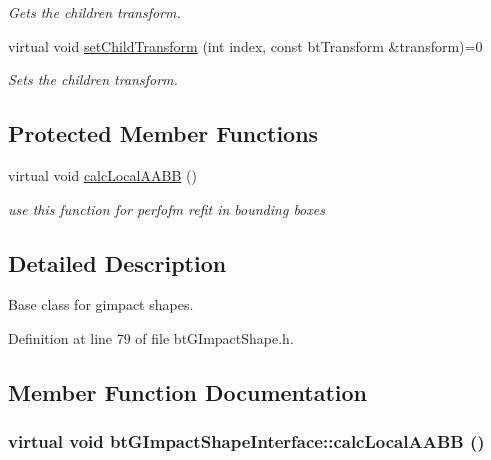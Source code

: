\begin{Indent}{\bf }
\begin{CompactItemize}
\begin{CompactList}\small\item\em Gets the children transform. \item\end{CompactList}\item 
virtual void \hyperlink{classbt_g_impact_shape_interface_83392f97bd7dfeb71ccdce6913a465b0}{setChildTransform} (int index, const btTransform \&transform)=0
\begin{CompactList}\small\item\em Sets the children transform. \item\end{CompactList}\end{CompactItemize}
\end{Indent}
\subsection*{Protected Member Functions}
\begin{CompactItemize}
\item 
virtual void \hyperlink{classbt_g_impact_shape_interface_1712a4613e20aa9249514dcd97f0a086}{calcLocalAABB} ()
\begin{CompactList}\small\item\em use this function for perfofm refit in bounding boxes \item\end{CompactList}\end{CompactItemize}


\subsection{Detailed Description}
Base class for gimpact shapes. 

Definition at line 79 of file btGImpactShape.h.

\subsection{Member Function Documentation}
\hypertarget{classbt_g_impact_shape_interface_1712a4613e20aa9249514dcd97f0a086}{
\subsubsection[calcLocalAABB]{\setlength{\rightskip}{0pt plus 5cm}virtual void btGImpactShapeInterface::calcLocalAABB ()}}
\label{classbt_g_impact_shape_interface_1712a4613e20aa9249514dcd97f0a086}



